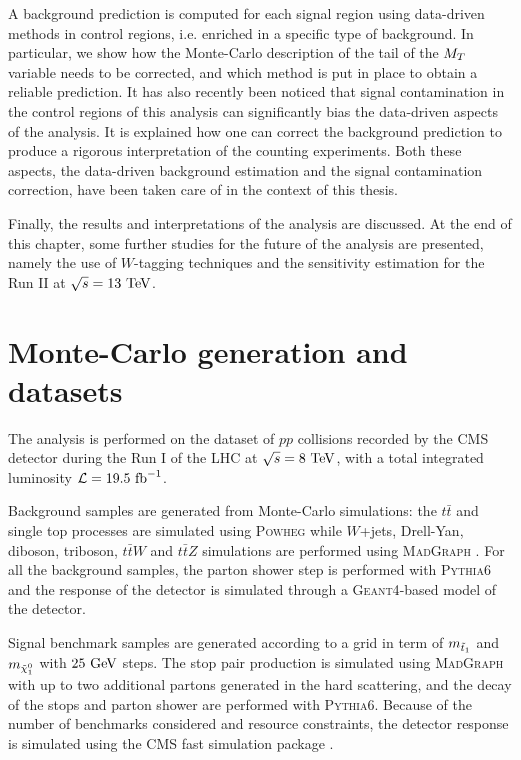     A background prediction is computed for each signal region using data-driven methods
    in control regions, i.e. enriched in a specific type of background. In particular, we
    show how the Monte-Carlo description of the tail of the $M_T$ variable needs to be
    corrected, and which method is put in place to obtain a reliable prediction.
    It has also recently been noticed that signal contamination in the control regions of
    this analysis can significantly bias the data-driven aspects of the analysis. It is
     explained how one can correct the background prediction to produce a rigorous
    interpretation of the counting experiments. Both these aspects, the data-driven
    background estimation and the signal contamination correction, have been taken care
    of in the context of this thesis.

    Finally, the results and interpretations of the analysis are discussed. At the end
    of this chapter, some further studies for the future of the analysis are presented,
    namely the use of $W$-tagging techniques and the sensitivity estimation for the Run II
    at $\sqrt{s} = 13~\text{TeV}$.

    \section{Monte-Carlo generation and datasets}

    The analysis is performed on the dataset of $pp$ collisions recorded by the CMS detector
    during the Run I of the LHC at $\sqrt{s} = 8~\text{TeV}$, with a total integrated luminosity
    $\mathcal{L} = 19.5~\text{fb}^{-1}$.

    Background samples are generated from Monte-Carlo simulations: the $t\bar{t}$ and
    single top processes are simulated using \textsc{Powheg} \cite{Powheg} while $W$+jets,
    Drell-Yan, diboson, triboson, $t\bar{t}W$ and $t\bar{t}Z$ simulations are performed
    using \textsc{MadGraph} \cite{Madgraph}. For all the background samples, the
    parton shower step is performed with \textsc{Pythia}6 \cite{Pythia} and the response of
    the detector is simulated through a \textsc{Geant4}-based model of the detector.

    Signal benchmark samples are generated according to a grid in term of $m_{\tilde{t}_1}$
    and $m_{\tilde{\chi}_1^0}$ with $25~\text{GeV}$ steps. The stop pair production is simulated
    using \textsc{MadGraph} with up to two additional partons generated in the hard scattering,
    and the decay of the stops and parton shower are performed with \textsc{Pythia6}. Because
    of the number of benchmarks considered and resource constraints, the detector
    response is simulated using the CMS fast simulation package \cite{Fastsim}.

